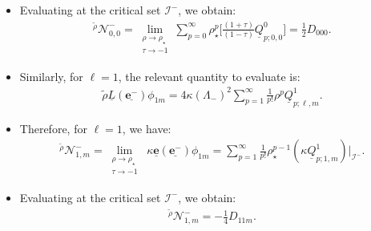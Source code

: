 \documentclass{beamer}
\theoremstyle{remark}
\theoremstyle{plain}
\theoremstyle{plain}
\begin{document}
\begin{frame}
  \begin{itemize}
    \item Evaluating at the critical set $\mathcal{I}^{-}$, we obtain:
    \begin{align}
      \mathcal{}^{\tilde{\rho}}\mathcal{N}^{-}_{0,0} = \lim_{\substack{\rho \to \rho_{\star} \\ \tau \to -1}}\sum_{p=0}^{\infty}\rho_{\star}^p\biggl[\frac{(1+\tau)}{(1-\tau)}\underline{Q}^{0}_{p;0,0}\biggr] = \frac{1}{2}D_{000}.
    \end{align}
    \item Similarly, for $\ell=1$, the relevant quantity to evaluate is:
    \begin{align}
      \tilde{\rho} \underline{L} (\underline{\boldsymbol{e}^{-}}) \phi_{1m}= 4\kappa(\Lambda_{-})^{2}\sum_{p=1}^{\infty}\frac{1}{p!}\rho^p\underline{Q}^{1}_{p;\ell,m}.
    \end{align}
    \item Therefore, for $\ell=1$, we have:
    \begin{align}
      \mathcal{}^{\tilde{\rho}}\mathcal{N}^{-}_{1,m} = \lim_{\substack{\rho \to \rho_{\star} \\ \tau \to -1}} \; \kappa\underline{\boldsymbol{e}}(\underline{\boldsymbol{e}^{-}})\phi_{1m} = \sum_{p=1}^{\infty}\frac{1}{p!}\rho_{\star}^{p-1}(\kappa \underline{Q}^{1}_{p;1,m})|_{\mathscr{I}^{-}}.
    \end{align}
    \item Evaluating at the critical set $\mathcal{I}^{-}$, we obtain:
    \begin{align}
      \mathcal{}^{\tilde{\rho}}\mathcal{N}^{-}_{1,m} = - \frac{1}{4}D_{11m}.
    \end{align}
  \end{itemize}
\end{frame}
\end{document}
